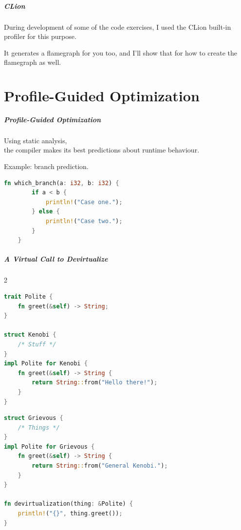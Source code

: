 \begin{frame}
\frametitle{CLion}

During development of some of the code exercises, I used the CLion built-in profiler for this purpose. 

It generates a flamegraph for you too, and I'll show that for how to create the flamegraph as well.


\end{frame}

\part{Profile-Guided Optimization}
\begin{frame}
\partpage
\end{frame}

\begin{frame}[fragile]
\frametitle{Profile-Guided Optimization}


Using static analysis, \\
the compiler makes its best predictions about runtime behaviour.

Example: branch prediction. 

\begin{lstlisting}[language=Rust]
    fn which_branch(a: i32, b: i32) {
        if a < b {
            println!("Case one.");
        } else {
            println!("Case two.");
        }
    }
\end{lstlisting}

\end{frame}

\begin{frame}[fragile]
\frametitle{A Virtual Call to Devirtualize}

\begin{multicols}{2}
\begin{lstlisting}[language=Rust]
trait Polite {
    fn greet(&self) -> String;
}

struct Kenobi {
    /* Stuff */
}
impl Polite for Kenobi {
    fn greet(&self) -> String {
        return String::from("Hello there!");
    }
}
\end{lstlisting}
\columnbreak
\begin{lstlisting}[language=Rust]
struct Grievous {
    /* Things */
}
impl Polite for Grievous {
    fn greet(&self) -> String {
        return String::from("General Kenobi.");
    }
}

fn devirtualization(thing: &Polite) {
    println!("{}", thing.greet());
}

\end{lstlisting}
\end{multicols}

\end{frame}


